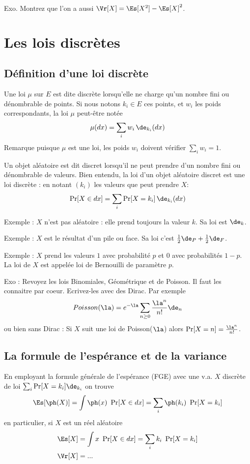 \documentclass{article}
\begin{document}
Exo. Montrez que l'on a aussi $\Vr[X] = \Es[X^2] - \Es[X]^2$. 


\section{Les lois discrètes}


\subsection{Définition d'une loi discrète}

 Une loi $\mu$ sur $E$ est dite discrète lorsqu'elle ne charge qu'un nombre fini ou dénombrable de points. Si nous notons $k_i\in E$ ces points, et $w_i$ les poids correspondants, la loi $\mu$ peut-être notée 
$$
\mu(dx)  = \sum_i w_i \,\de_{k_i} (dx)
$$  
Remarque puisque $\mu$ est une loi, les poids $w_i$ doivent vérifier $\sum_i w_i=1$. 

Un objet aléatoire est dit discret lorsqu'il ne peut prendre d'un nombre fini ou dénombrable de valeurs. Bien entendu, la loi d'un objet aléatoire discret est une loi discrète : en notant $(k_i)$ les valeurs que peut prendre $X$:
$$
 \Pr[X \in dx ]   = \sum_i  \Pr[X=k_i] \, \de_{k_i}(dx) 
$$ 


Exemple :  $X$ n'est pas aléatoire : elle prend toujours la valeur $k$. Sa loi est $\de_k$. 

Exemple : $X$ est le résultat d'un pile ou face. Sa loi c'est $\frac 1  2 \de_P + \frac 12 \de_F$.  

Exemple : $X$ prend les valeurs $1$ avec probabilité $p$ et $0$ avec probabilités $1-p$. La loi de $X$ est appelée loi de Bernouilli de paramètre $p$. 

Exo : Revoyez les lois Binomiales, Géométrique et de Poisson. Il faut les  connaitre par coeur.  Ecrivez-les avec des Dirac. Par exemple
$$
Poisson(\la) = e^{-\la }\sum_{n\geq 0}   \frac {\la^n}{n!}  \de_n
$$ 
ou bien sans Dirac : Si $X$ suit une loi de Poisson($\la$) alors $\Pr[X=n] =  \frac {\la^n}{n!}  $. 




\subsection{La formule de l'espérance et de la variance}


En employant la formule générale de l'espérance (FGE) avec une v.a. $X$ discrète  de loi $\sum_i \Pr[X=k_i] \de_{k_i}$ on trouve 
$$
\Es[\ph(X)]  = \int \ph(x) \ \Pr[X\in dx ]  =    \sum_i \ph(k_i) \ \Pr[X=k_i]
$$ 
en particulier, si $X$ est un réel aléatoire 
\begin{alignat*}{1}
\Es[X]  &= \int x \ \Pr[X\in dx ]  =    \sum_i   k_i \ \Pr[X=k_i]\\
\Vr [X]  &=  ... 
\end{alignat*}
 
\end{document}
